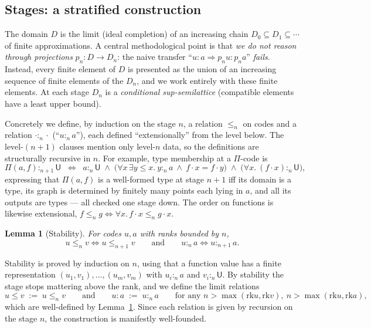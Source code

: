 \documentclass[11pt]{article}
\newcommand{\U}{\mathsf{U}}
\newcommand{\PiC}[2]{\Pi(#1,#2)}        %
\newcommand{\ev}[2]{#1\!\cdot\!#2}      %
\newcommand{\rk}{\mathrm{rk}}
\newcommand{\lest}[1]{\mathrel{\leq_{#1}}}      %
\newcommand{\memst}[3]{#1 \mathrel{:_{#2}} #3}   %
\theoremstyle{plain}
\newtheorem{lemma}{Lemma}
\theoremstyle{definition}
\begin{document}
\subsection{Stages: a stratified construction}
\label{sec:stages}

The domain $D$ is the limit (ideal completion) of an increasing chain
$D_0 \subseteq D_1 \subseteq \cdots$ of finite approximations.  A central
methodological point is that \emph{we do not reason through projections}
$p_n : D \to D_n$: the naive transfer ``$u : a \Rightarrow p_n u : p_n a$''
\emph{fails}.  Instead, every finite element of $D$ is presented as the union
of an increasing sequence of finite elements of the $D_n$, and we work
entirely with these finite elements.  At each stage $D_n$ is a
\emph{conditional sup-semilattice} (compatible elements have a least upper
bound).

Concretely we define, by induction on the stage $n$, a relation $\lest{n}$ on
codes and a relation $\memst{\cdot}{n}{\cdot}$ (``$u :_n a$''), each defined
``extensionally'' from the level below.  The level-$(n{+}1)$ clauses mention
only level-$n$ data, so the definitions are structurally recursive in $n$.
For example, type membership at a $\Pi$-code is
\begin{equation}
  \label{eq:stage-pi}
  \memst{\PiC{a}{f}}{n+1}{\U}
  \;\;\Longleftrightarrow\;\;
  \memst{a}{n}{\U}
  \;\wedge\;
  \bigl(\forall x\,\exists y\leq x.\ \memst{y}{n}{a}\ \wedge\ \ev f x = \ev f y\bigr)
  \;\wedge\;
  \bigl(\forall x.\ \memst{(\ev f x)}{n}{\U}\bigr),
\end{equation}
expressing that $\PiC{a}{f}$ is a well-formed type at stage $n{+}1$ iff its
domain is a type, its graph is determined by finitely many points each lying
in $a$, and all its outputs are types --- all checked one stage down.  The
order on functions is likewise extensional, $f \lest{n} g \iff \forall x.\,
\ev f x \lest{n} \ev g x$.

\begin{lemma}[Stability]\label{lem:stab}
  For codes $u,a$ with ranks bounded by $n$,
  \[
    u \lest{n} v \iff u \lest{n+1} v
    \qquad\text{and}\qquad
    \memst{u}{n}{a} \iff \memst{u}{n+1}{a}.
  \]
\end{lemma}
Stability is proved by induction on $n$, using that a function value has a
finite representation $(u_1,v_1),\dots,(u_m,v_m)$ with $\memst{u_i}{n}{a}$ and
$\memst{v_i}{n}{\U}$.  By stability the stage stops mattering above the rank,
and we define the limit relations
\[
  u \leq v \;:=\; u \lest{n} v
  \qquad\text{and}\qquad
  u : a \;:=\; \memst{u}{n}{a}
  \qquad\text{for any } n > \max(\rk u, \rk v),\ n > \max(\rk u, \rk a),
\]
which are well-defined by Lemma~\ref{lem:stab}.  Since each relation is given
by recursion on the stage $n$, the construction is manifestly well-founded.
\end{document}

